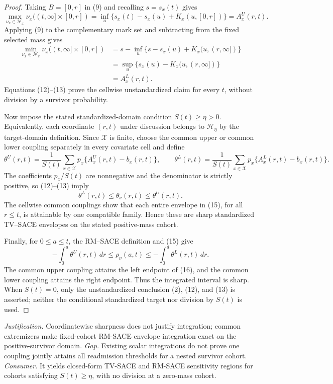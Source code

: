 \documentclass{article}
\begin{document}
\begin{proof}
Taking \(B=[0,r]\) in (9) and recalling \(s=s_x(t)\) gives
\[
\max_{\nu_x\in\mathcal N_x}
\nu_x((t,\infty]\times[0,r])
=\inf_u\{s_x(t)-s_x(u)+K_x(u,[0,r])\}
=A_x^U(r,t). \tag{12}
\]
Applying (9) to the complementary mark set and subtracting from the fixed selected mass gives
\[
\begin{aligned}
\min_{\nu_x\in\mathcal N_x}
\nu_x((t,\infty]\times[0,r])
&=s-\inf_u\{s-s_x(u)+K_x(u,(r,\infty])\}\\
&=\sup_u\{s_x(u)-K_x(u,(r,\infty])\}\\
&=A_x^L(r,t).
\end{aligned} \tag{13}
\]
Equations (12)--(13) prove the cellwise unstandardized claim for every \(t\), without division by a survivor probability.

Now impose the stated standardized-domain condition \(S(t)\geq\eta>0\).  Equivalently, each coordinate \((r,t)\) under discussion belongs to \(\mathcal H_\eta\) by the target-domain definition.  Since \(\mathcal X\) is finite, choose the common upper or common lower coupling separately in every covariate cell and define
\[
\theta^U(r,t)=\frac{1}{S(t)}
\sum_{x\in\mathcal X}p_x\{A_x^U(r,t)-b_x(r,t)\},
\qquad
\theta^L(r,t)=\frac{1}{S(t)}
\sum_{x\in\mathcal X}p_x\{A_x^L(r,t)-b_x(r,t)\}. \tag{14}
\]
The coefficients \(p_x/S(t)\) are nonnegative and the denominator is strictly positive, so (12)--(13) imply
\[
\theta^L(r,t)\leq\theta_\nu(r,t)\leq\theta^U(r,t). \tag{15}
\]
The cellwise common couplings show that each entire envelope in (15), for all \(r\leq t\), is attainable by one compatible family.  Hence these are sharp standardized TV--SACE envelopes on the stated positive-mass cohort.

Finally, for \(0\leq a\leq t\), the RM--SACE definition and (15) give
\[
-\int_0^a\theta^U(r,t)\,dr
\leq \rho_\nu(a,t)
\leq -\int_0^a\theta^L(r,t)\,dr. \tag{16}
\]
The common upper coupling attains the left endpoint of (16), and the common lower coupling attains the right endpoint.  Thus the integrated interval is sharp.  When \(S(t)=0\), only the unstandardized conclusion (2), (12), and (13) is asserted; neither the conditional standardized target nor division by \(S(t)\) is used.
\end{proof}
\par\smallskip\noindent \textit{Justification.} Coordinatewise sharpness does not justify integration; common extremizers make fixed-cohort RM-SACE envelope integration exact on the positive-survivor domain. \textit{Gap.} Existing scalar integrations do not prove one coupling jointly attains all readmission thresholds for a nested survivor cohort. \textit{Consumer.} It yields closed-form TV-SACE and RM-SACE sensitivity regions for cohorts satisfying \(S(t)\geq\eta\), with no division at a zero-mass cohort.
\end{document}
